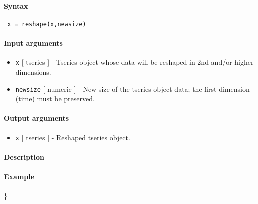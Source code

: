 


	\paragraph{Syntax}
 
 \begin{verbatim}
 x = reshape(x,newsize)
 \end{verbatim}
 
 \paragraph{Input arguments}
 
 \begin{itemize}
 \item
   \texttt{x} {[} tseries {]} - Tseries object whose data will be
   reshaped in 2nd and/or higher dimensions.
 \item
   \texttt{newsize} {[} numeric {]} - New size of the tseries object
   data; the first dimension (time) must be preserved.
 \end{itemize}
 
 \paragraph{Output arguments}
 
 \begin{itemize}
 \item
   \texttt{x} {[} tseries {]} - Reshaped tseries object.
 \end{itemize}
 
 \paragraph{Description}
 
 \paragraph{Example}
 
 \}


